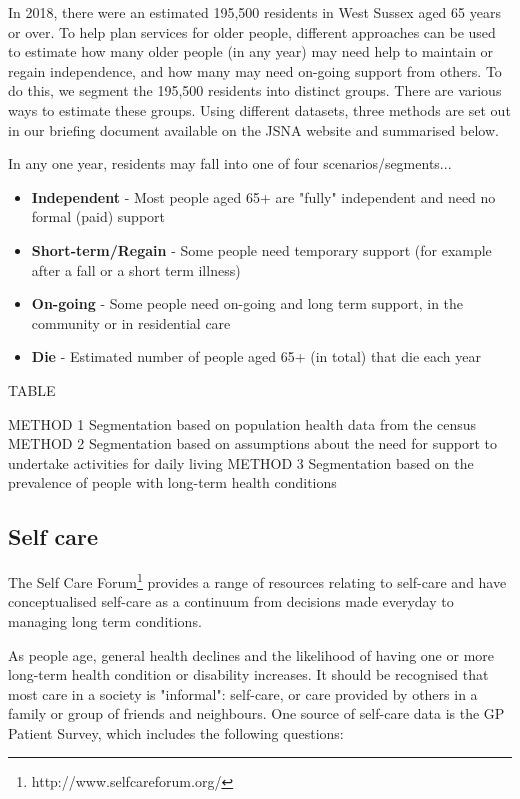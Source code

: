 \begin{tcolorbox}[title={Estimating Care Needs in a Population},colback={boxcolour}]
In 2018, there were an estimated 195,500 residents in West Sussex aged 65 years or over. To help plan services for older people, different approaches can be used to estimate how many older people (in any year) may need help to maintain or regain independence, and how many may need on-going support from others. To do this, we segment the 195,500 residents into distinct groups. There are various ways to estimate these groups. Using different datasets, three methods are set out in our briefing document available on the JSNA website and summarised below.

In any one year, residents may fall into one of four scenarios/segments...

\begin{itemize}
    \item {\bf Independent} - Most people aged 65+ are "fully" independent and need no formal (paid) support
    \item {\bf Short-term/Regain} - Some people need temporary support (for example after a fall or a short term illness)
    \item {\bf On-going} - Some people need on-going and long term support, in the community or in residential care
    \item {\bf Die} - Estimated number of people aged 65+ (in total) that die each year
\end{itemize}
\end{tcolorbox}

TABLE

METHOD 1 Segmentation based on population health data from the census
METHOD 2 Segmentation based on assumptions about the need for support to undertake activities for daily living
METHOD 3 Segmentation based on the prevalence of people with long-term health conditions

\subsection{Self care} 
The Self Care Forum\footnote{http://www.selfcareforum.org/} provides a range of resources relating to self-care and have conceptualised self-care as a continuum from decisions made everyday to managing long term conditions.

As people age, general health declines and the likelihood of having one or more long-term health condition or disability increases. It should be recognised that most care in a society is "informal": self-care, or care provided by others in a family or group of friends and neighbours. One source of self-care data is the GP Patient Survey, which includes the following questions:

